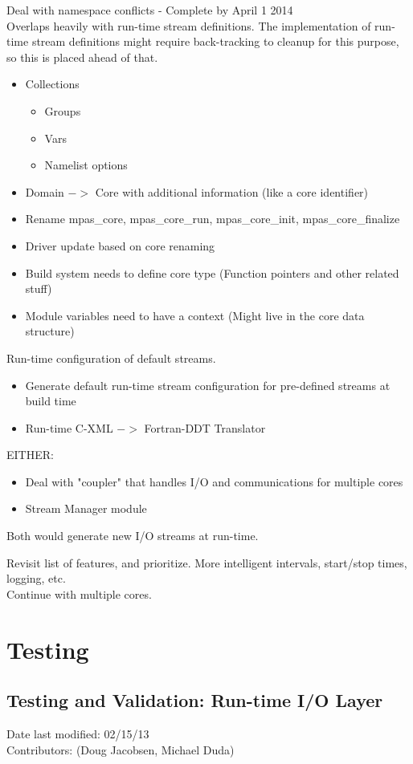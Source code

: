 \documentclass[11pt]{report}
\begin{document}
\noindent Deal with namespace conflicts - Complete by April 1 2014 \\
Overlaps heavily with run-time stream definitions. The implementation of
run-time stream definitions might require back-tracking to cleanup for this
purpose, so this is placed ahead of that.
\begin{itemize}
	\item Collections
	\begin{itemize}
		\item Groups
		\item Vars
		\item Namelist options
	\end{itemize}
	\item Domain $->$ Core with additional information (like a core identifier)
	\item Rename mpas\_core, mpas\_core\_run, mpas\_core\_init, mpas\_core\_finalize
	\item Driver update based on core renaming
	\item Build system needs to define core type (Function pointers and other related stuff)
	\item Module variables need to have a context (Might live in the core data structure)
\end{itemize}

\noindent Run-time configuration of default streams.
\begin{itemize}
	\item Generate default run-time stream configuration for pre-defined streams at build time
	\item Run-time C-XML $->$ Fortran-DDT Translator
\end{itemize}

\noindent EITHER:\\
\begin{itemize}
	\item Deal with "coupler" that handles I/O and communications for multiple cores
	\item Stream Manager module
\end{itemize}
Both would generate new I/O streams at run-time.

\noindent Revisit list of features, and prioritize. More intelligent intervals, start/stop times, logging, etc. \\

\noindent Continue with multiple cores.
\chapter{Testing}

\section{Testing and Validation: Run-time I/O Layer}
Date last modified: 02/15/13 \\
Contributors: (Doug Jacobsen, Michael Duda) \\



\end{document}
